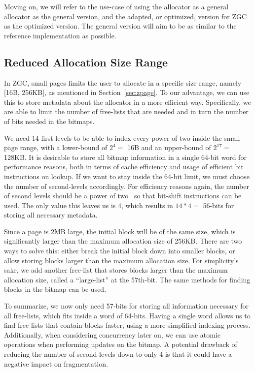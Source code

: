 Moving on, we will refer to the use-case of using the allocator as a general allocator as the general version, and the adapted, or optimized, version for ZGC as the optimized version. The general version will aim to be as similar to the reference implementation as possible.

\subsection{Reduced Allocation Size Range}
\label{sec:adaptations:reduced_allocation_range}

In ZGC, small pages limits the user to allocate in a specific size range, namely [16B, 256KB], as mentioned in Section~\ref{sec:zpage}. To our advantage, we can use this to store metadata about the allocator in a more efficient way. Specifically, we are able to limit the number of free-lists that are needed and in turn the number of bits needed in the bitmaps.

We need 14 first-levels to be able to index every power of two inside the small page range, with a lower-bound of $2^4 =$ 16B and an upper-bound of $2^{17} =$ 128KB. It is desirable to store all bitmap information in a single 64-bit word for performance reasons, both in terms of cache efficiency and usage of efficient bit instructions on lookup. If we want to stay inside the 64-bit limit, we must choose the number of second-levels accordingly. For efficiency reasons again, the number of second levels should be a power of two~\cite{TLSF} so that bit-shift instructions can be used. The only value this leaves us is 4, which results in $14 * 4 =$ 56-bits for storing all necessary metadata.

Since a page is 2MB large, the initial block will be of the same size, which is significantly larger than the maximum allocation size of 256KB. There are two ways to solve this: either break the initial block down into smaller blocks, or allow storing blocks larger than the maximum allocation size. For simplicity's sake, we add another free-list that stores blocks larger than the maximum allocation size, called a ``large-list'' at the 57th-bit. The same methods for finding blocks in the bitmap can be used.

To summarize, we now only need 57-bits for storing all information necessary for all free-lists, which fits inside a word of 64-bits. Having a single word allows us to find free-lists that contain blocks faster, using a more simplified indexing process. Additionally, when considering concurrency later on, we can use atomic operations when performing updates on the bitmap. A potential drawback of reducing the number of second-levels down to only 4 is that it could have a negative impact on fragmentation.

